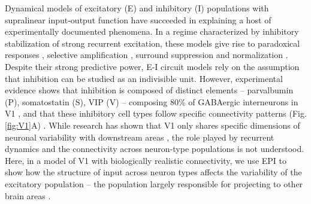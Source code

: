 \documentclass[11pt]{article}
\begin{document}
Dynamical models of excitatory (E) and inhibitory (I) populations with supralinear input-output function have succeeded in explaining a host of experimentally documented phenomena.
In a regime characterized by inhibitory stabilization of strong recurrent excitation, these models give rise to paradoxical responses \cite{tsodyks1997paradoxical}, selective amplification  \cite{goldman2009memory, murphy2009balanced}, surround suppression \cite{ozeki2009inhibitory} and normalization \cite{rubin2015stabilized}. 
Despite their strong predictive power, E-I circuit models rely on the assumption that inhibition can be studied as an indivisible unit. 
However, experimental evidence shows that inhibition is composed of distinct elements -- parvalbumin (P), somatostatin (S), VIP (V) --
composing 80\% of GABAergic interneurons in V1 \cite{markram2004interneurons, rudy2011three, tremblay2016}, and that these inhibitory cell types follow specific connectivity patterns (Fig. \ref{fig:V1}A) \cite{pfeffer2013inhibition}.
While research has shown that V1 only shares specific dimensions of neuronal variability with downstream areas \cite{semedo2019cortical}, the role played by recurrent dynamics and the connectivity across neuron-type populations is not understood.
Here, in a model of V1 with biologically realistic connectivity, we use EPI to show how the structure of input across neuron types affects the variability of the excitatory population -- the population largely responsible for projecting to other brain areas \cite{felleman1991distributed}.
\end{document}
